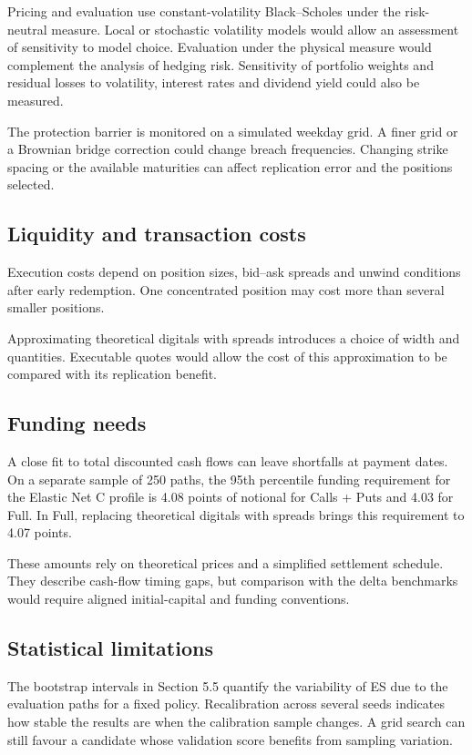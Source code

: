 \documentclass[12pt,a4paper]{article}
\newcommand{\1}{\mathbf{1}}
\begin{document}
Pricing and evaluation use constant-volatility Black--Scholes under the risk-neutral measure. Local or stochastic volatility models would allow an assessment of sensitivity to model choice. Evaluation under the physical measure would complement the analysis of hedging risk. Sensitivity of portfolio weights and residual losses to volatility, interest rates and dividend yield could also be measured.

The protection barrier is monitored on a simulated weekday grid. A finer grid or a Brownian bridge correction could change breach frequencies. Changing strike spacing or the available maturities can affect replication error and the positions selected.

\subsection{Liquidity and transaction costs}

Execution costs depend on position sizes, bid--ask spreads and unwind conditions after early redemption. One concentrated position may cost more than several smaller positions.

Approximating theoretical digitals with spreads introduces a choice of width and quantities. Executable quotes would allow the cost of this approximation to be compared with its replication benefit.

\subsection{Funding needs}

A close fit to total discounted cash flows can leave shortfalls at payment dates. On a separate sample of 250 paths, the 95th percentile funding requirement for the Elastic Net C profile is 4.08 points of notional for Calls + Puts and 4.03 for Full. In Full, replacing theoretical digitals with spreads brings this requirement to 4.07 points.

These amounts rely on theoretical prices and a simplified settlement schedule. They describe cash-flow timing gaps, but comparison with the delta benchmarks would require aligned initial-capital and funding conventions.

\subsection{Statistical limitations}

The bootstrap intervals in Section 5.5 quantify the variability of ES due to the evaluation paths for a fixed policy. Recalibration across several seeds indicates how stable the results are when the calibration sample changes. A grid search can still favour a candidate whose validation score benefits from sampling variation.
\end{document}
